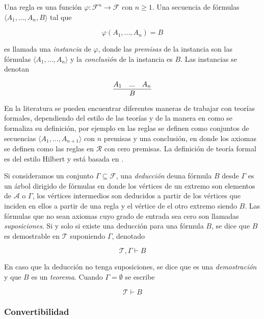 Una regla es una función \( φ \colon \mathcal{F}^{n} \to \mathcal{F} \) con \( n \geq 1 \). Una secuencia de fórmulas \( \langle A_{1},...,A_{n},B \rangle \) tal que

\[ φ(A_{1},...,A_{n})=B \]

es llamada una \emph{instancia} de \( φ \), donde las \emph{premisas} de la instancia son las fórmulas \( \langle A_{1},...,A_{n} \rangle \) y la \emph{conclusión} de la instancia es \( B \). Las instancias se denotan

\[ \infer{B}{A_{1} & ... & A_{n}} \]

\begin{rem}
  En la literatura se pueden encuentrar diferentes maneras de trabajar con teorías formales, dependiendo del estilo de las teorías y de la manera en como se formaliza su definición, por ejemplo en \cite{Troelstra:ProofTheory} las reglas se definen como conjuntos de secuencias \( \langle A_{1},...,A_{n+1} \rangle \) con \( n \) premisas y una conclusión, en donde los axiomas se definen como las reglas en \( \mathcal{R} \) con cero premisas. La definición de teoría formal es del estilo Hilbert y está basada en \cite[pp.~69--70]{HindleySeldin:LambdaCalculusAndCombinators}.
\end{rem}

Si consideramos un conjunto \( Γ \subseteq \mathcal{F} \), una \emph{deducción} deuna fórmula \( B \) desde \( Γ \) es un árbol dirigido de fórmulas en donde los vértices de un extremo son elementos de \( \mathcal{A} \) o \( Γ \), los vértices intermedios son deducidos a partir de los vértices que inciden en ellos a partir de una regla y el vértice de el otro extremo siendo \( B \). Las fórmulas que no sean axiomas cuyo grado de entrada sea cero son llamadas \emph{suposiciones}. Si y solo si existe una deducción para una fórmula \( B \), se dice que \( B \) es demostrable en \( \mathcal{T} \) suponiendo \( Γ \), denotado

\[ \mathcal{T},Γ \vdash B \]

En caso que la deducción no tenga suposiciones, se dice que es una \emph{demostración} y que \( B \) es un \emph{teorema}. Cuando \( Γ = \emptyset \) se escribe

\[ \mathcal{T} \vdash B \]

\subsubsection{Convertibilidad}
\label{sec:teorias-convertibilidad}

